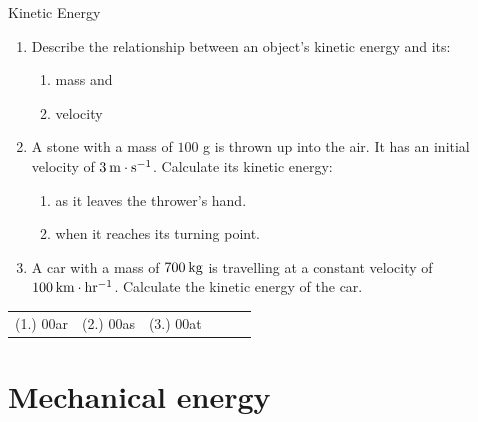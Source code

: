 \label{m38785*secfhsst!!!underscore!!!id1491}
\begin{exercises}{Kinetic Energy }
            \nopagebreak
\noindent \begin{enumerate}[noitemsep, label=\textbf{\arabic*}. ] 
            \label{m38785*uid69}\item Describe the relationship between an object's kinetic energy and its:
\label{m38785*id68139}\begin{enumerate}[noitemsep, label=\textbf{\alph*}. ] 
\label{m38785*uid70}\item mass and
\label{m38785*uid71}\item velocity
\end{enumerate}
\label{m38785*uid72}\item A stone with a mass of $100$ g is thrown up into the air. It has an initial velocity of $3\phantom{\rule{2pt}{0ex}}\text{m}\ensuremath{\cdot}\text{s}{}^{-1}$. Calculate its kinetic energy:
\label{m38785*id68206}\begin{enumerate}[noitemsep, label=\textbf{\alph*}. ] 
            \label{m38785*uid73}\item as it leaves the thrower's hand.
\label{m38785*uid74}\item when it reaches its turning point.
\end{enumerate}
                \label{m38785*uid75}\item A car with a mass of $700\phantom{\rule{2pt}{0ex}}\text{kg}$ is travelling at a constant velocity of $100\phantom{\rule{2pt}{0ex}}\text{km}\ensuremath{\cdot}\text{hr}{}^{-1}$. Calculate the kinetic energy of the car.\newline
\end{enumerate}
  \label{m38785**end}
\par \practiceinfo
 \par \begin{tabular}[h]{cccccc}
 (1.) 00ar  &  (2.) 00as  &  (3.) 00at  & \end{tabular}
\end{exercises}
         

\section{Mechanical energy}
    \nopagebreak

